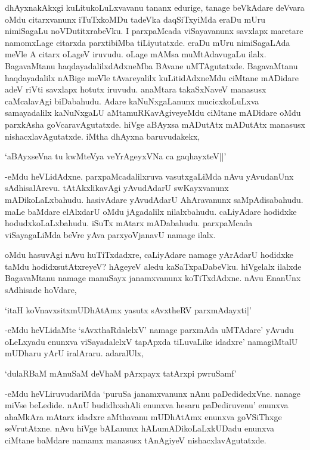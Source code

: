 dhAyxnakAkxgi kuLitukoLuLxvavanu tananx edurige, tanage beVkAdare deVvara oMdu citarxvanunx iTuTxkoMDu tadeVka daqSiTxyiMda eraDu mUru nimiSagaLu noVDutitxrabeVku. I parxpaMcada viSayavanunx savxlapx maretare namomxLage citarxda parxtibiMba tiLiyutatxde. eraDu mUru nimiSagaLAda meVle A citarx oLageV iruvudu. oLage mAMsa muMtAdavugaLu ilalx. BagavaMtanu haqdayadalilxdAdxneMba BAvane uMTAgutatxde. BagavaMtanu haqdayadalilx nABige meVle tAvareyalilx kuLitidAdxneMdu ciMtane mADidare adeV riVti savxlapx hotutx iruvudu. anaMtara takaSxNaveV manasusx caMcalavAgi biDabahudu. Adare kaNuNxgaLanunx mucicxkoLuLxva samayadalilx kaNuNxgaLU aMtamuRKavAgiveyeMdu ciMtane mADidare oMdu parxkAsha goVcaravAgutatxde. hiVge aBAyxsa mADutAtx mADutAtx manasusx nishacxlavAgutatxde. iMtha dhAyxna baruvudakekx,

\begin{shloka}
`aBAyxseVna tu kwMteVya veYrAgeyxVNa ca gaqhayxteV||'
\end{shloka} 

-eMdu heVLidAdxne. parxpaMcadalilxruva vasutxgaLiMda nAvu yAvudanUnx sAdhisalArevu. tAtAkxlikavAgi yAvudAdarU swKayxvanunx mADikoLaLxbahudu. hasivAdare yAvudAdarU AhAravanunx saMpAdisabahudu. maLe baMdare elAlxdarU oMdu jAgadalilx nilalxbahudu. caLiyAdare hodidxke hodudxkoLaLxbahudu. iSuTx mAtarx mADabahudu. parxpaMcada viSayagaLiMda beVre yAva parxyoVjanavU namage ilalx.

oMdu hasuvAgi nAvu huTiTxdadxre, caLiyAdare namage yArAdarU hodidxke taMdu hodidxsutAtxreyeV? hAgeyeV aledu kaSaTxpaDabeVku. hiVgelalx ilalxde BagavaMtanu namage manuSayx janamxvanunx koTiTxdAdxne. nAvu EnanUnx sAdhisade hoVdare,

\begin{shloka}
`itaH koVnavxsitxmUDhAtAmx yasutx sAvxtheRV parxmAdayxti|'
\end{shloka} 

-eMdu heVLidaMte `sAvxthaRdalelxV' namage parxmAda uMTAdare' yAvudu oLeLxyadu enunxva viSayadalelxV tapApxda tiLuvaLike idadxre' namagiMtalU mUDharu yArU iralAraru. adaralUlx,

\begin{shloka}
`dulaRBaM mAnuSaM deVhaM pArxpayx tatArxpi pwruSamf'
\end{shloka}

-eMdu heVLiruvudariMda `puruSa janamxvanunx nAnu paDedidedxVne. nanage miVse beLedide. nAnU budidhxshAli enunxva hesaru paDediruvenu' enunxva ahaMkAra mAtarx idadxre aMthavanu mUDhAtAmx enunxva goVSiThxge seVrutAtxne. nAvu hiVge bALanunx hALumADikoLaLxkUDadu enunxva ciMtane baMdare namamx manasusx tAnAgiyeV nishacxlavAgutatxde.

